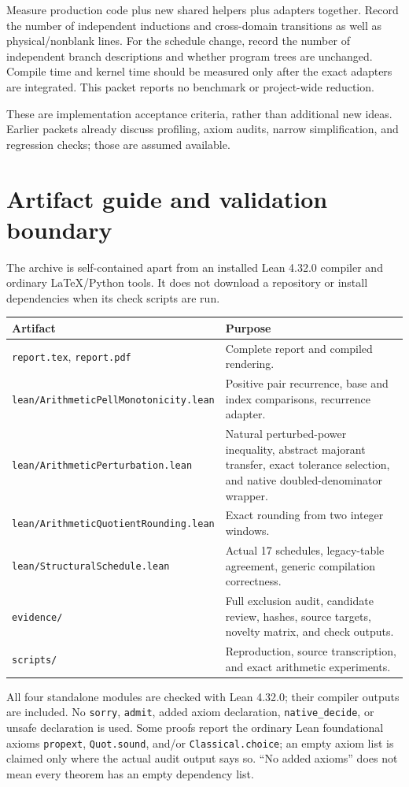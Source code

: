 \documentclass[11pt,a4paper]{article}
\newcommand{\code}[1]{\nolinkurl{#1}}
\begin{document}
Measure production code plus new shared helpers plus adapters together.
Record the number of independent inductions and cross-domain transitions as
well as physical/nonblank lines. For the schedule change, record the number
of independent branch descriptions and whether program trees are unchanged.
Compile time and kernel time should be measured only after the exact adapters
are integrated. This packet reports no benchmark or project-wide reduction.

These are implementation acceptance criteria, rather than additional new
ideas. Earlier packets already discuss profiling, axiom audits, narrow
simplification, and regression checks; those are assumed available.

\section{Artifact guide and validation boundary}

The archive is self-contained apart from an installed Lean 4.32.0 compiler
and ordinary LaTeX/Python tools. It does not download a repository or install
dependencies when its check scripts are run.

\begin{tabularx}{\textwidth}{@{}P{62mm}Y@{}}
\toprule
Artifact & Purpose\\
\midrule
\code{report.tex}, \code{report.pdf} & Complete report and compiled rendering.\\
\code{lean/ArithmeticPellMonotonicity.lean} & Positive pair recurrence, base and index comparisons, recurrence adapter.\\
\code{lean/ArithmeticPerturbation.lean} & Natural perturbed-power inequality, abstract majorant transfer, exact tolerance selection, and native doubled-denominator wrapper.\\
\code{lean/ArithmeticQuotientRounding.lean} & Exact rounding from two integer windows.\\
\code{lean/StructuralSchedule.lean} & Actual 17 schedules, legacy-table agreement, generic compilation correctness.\\
\code{evidence/} & Full exclusion audit, candidate review, hashes, source targets, novelty matrix, and check outputs.\\
\code{scripts/} & Reproduction, source transcription, and exact arithmetic experiments.\\
\bottomrule
\end{tabularx}

All four standalone modules are checked with Lean 4.32.0; their compiler
outputs are included. No \code{sorry}, \code{admit}, added axiom declaration,
\code{native_decide}, or unsafe declaration is used. Some proofs report the
ordinary Lean foundational axioms \code{propext}, \code{Quot.sound}, and/or
\code{Classical.choice}; an empty axiom list is claimed only where the actual
audit output says so. ``No added axioms'' does not mean every theorem has an
empty dependency list.
\end{document}
